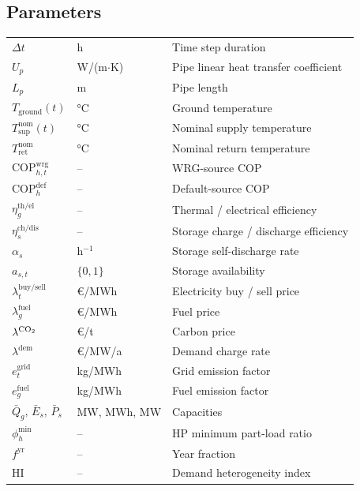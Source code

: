\documentclass[review,3p]{elsarticle}
\begin{document}
\subsection*{Parameters}
\begin{tabular}{@{}p{2.8cm}p{2.0cm}p{7.5cm}@{}}
$\Delta t$                              & h             & Time step duration \\
$U_p$                                   & W/(m$\cdot$K) & Pipe linear heat transfer coefficient \\
$L_p$                                   & m             & Pipe length \\
$T_{\mathrm{ground}}(t)$               & \si{\celsius} & Ground temperature \\
$T_{\mathrm{sup}}^{\mathrm{nom}}(t)$   & \si{\celsius} & Nominal supply temperature \\
$T_{\mathrm{ret}}^{\mathrm{nom}}$      & \si{\celsius} & Nominal return temperature \\
$\mathrm{COP}_{h,t}^{\mathrm{wrg}}$   & --            & WRG-source COP \\
$\mathrm{COP}_{h}^{\mathrm{def}}$      & --            & Default-source COP \\
$\eta_g^{\mathrm{th/el}}$              & --            & Thermal / electrical efficiency \\
$\eta_{s}^{\mathrm{ch/dis}}$           & --            & Storage charge / discharge efficiency \\
$\alpha_s$                             & h$^{-1}$      & Storage self-discharge rate \\
$a_{s,t}$                              & $\{0,1\}$     & Storage availability \\
$\lambda_t^{\mathrm{buy/sell}}$        & \euro/MWh     & Electricity buy / sell price \\
$\lambda_g^{\mathrm{fuel}}$            & \euro/MWh     & Fuel price \\
$\lambda^{\ce{CO2}}$                   & \euro/t       & Carbon price \\
$\lambda^{\mathrm{dem}}$               & \euro/MW/a    & Demand charge rate \\
$e_t^{\mathrm{grid}}$                  & kg/MWh        & Grid emission factor \\
$e_g^{\mathrm{fuel}}$                  & kg/MWh        & Fuel emission factor \\
$\bar{Q}_g,\, \bar{E}_s,\, \bar{P}_s$ & MW, MWh, MW   & Capacities \\
$\phi_h^{\mathrm{min}}$                & --            & HP minimum part-load ratio \\
$f^{\mathrm{yr}}$                      & --            & Year fraction \\
$\mathrm{HI}$                          & --            & Demand heterogeneity index \\
\end{tabular}
\end{document}
